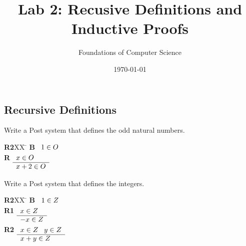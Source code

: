 \documentclass[]{exam}
\title{Lab 2: Recusive Definitions and Inductive Proofs}
\author{Foundations of Computer Science}
\date{\today}
\begin{document}
\maketitle

\begin{questions}

\section*{Recursive Definitions}
\question Write a Post system that defines the odd natural numbers.
\begin{solution}
\begin{tabbing}
{\bf R2}XX \=  \kill
{\bf B} \>
        \(\begin{array}[t]{l}
        1\in O
        \end{array}\) \\[2ex]
{\bf R} \>
        \(\begin{array}[t]{l}
        x \in O \\
        \hline
        x + 2 \in O
        \end{array}\)
\end{tabbing}
\end{solution}

\question Write a Post system that defines the integers.
\begin{solution}
\begin{tabbing}
{\bf R2}XX \=  \kill
{\bf B} \>
        \(\begin{array}[t]{l}
        1\in Z
        \end{array}\) \\[2ex]
{\bf R1} \>
        \(\begin{array}[t]{l}
        x \in Z \\
        \hline
        -x \in Z
        \end{array}\) \\[2ex]
{\bf R2} \>
        \(\begin{array}[t]{l}
        x \in Z \;\;\;y \in Z \\
        \hline
        x + y \in Z
        \end{array}\)
\end{tabbing}
\end{solution}



\end{questions}
\end{document}
